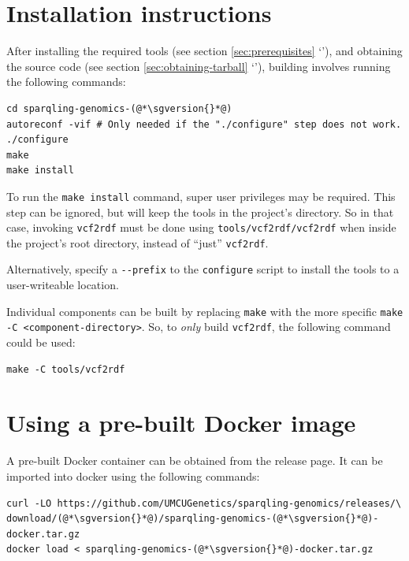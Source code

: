 \section{Installation instructions}

  After installing the required tools (see section \ref{sec:prerequisites}
  {\color{LinkGray}`'}), and obtaining the source
  code (see section \ref{sec:obtaining-tarball} {\color{LinkGray}
    `'}), building involves running the following
  commands:

\begin{siderules}
\begin{lstlisting}
cd sparqling-genomics-(@*\sgversion{}*@)
autoreconf -vif # Only needed if the "./configure" step does not work.
./configure
make
make install
\end{lstlisting}
\end{siderules}

  To run the \texttt{make install} command, super user privileges may be
  required.  This step can be ignored, but will keep the tools in the project's
  directory.  So in that case, invoking \texttt{vcf2rdf} must be done using
  \texttt{tools/vcf2rdf/vcf2rdf} when inside the project's root directory,
  instead of ``just'' \texttt{vcf2rdf}.

  Alternatively, specify a \texttt{-{}-prefix} to the \texttt{configure}
  script to install the tools to a user-writeable location.

  Individual components can be built by replacing \texttt{make} with the
  more specific \texttt{make -C <component-directory>}.  So, to \emph{only}
  build \texttt{vcf2rdf}, the following command could be used:

\begin{siderules}
\begin{verbatim}
make -C tools/vcf2rdf
\end{verbatim}
\end{siderules}

\section{Using a pre-built Docker image}

  A pre-built Docker container can be obtained from the release page.  It
  can be imported into docker using the following commands:

\begin{siderules}
\begin{lstlisting}
curl -LO https://github.com/UMCUGenetics/sparqling-genomics/releases/\
download/(@*\sgversion{}*@)/sparqling-genomics-(@*\sgversion{}*@)-docker.tar.gz
docker load < sparqling-genomics-(@*\sgversion{}*@)-docker.tar.gz
\end{lstlisting}
\end{siderules}

